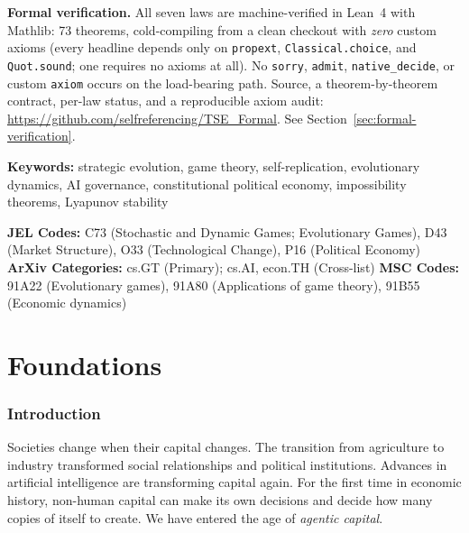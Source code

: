 \documentclass[12pt]{article}
\begin{document}
\noindent\textbf{Formal verification.} All seven laws are machine-verified in Lean~4 with Mathlib: 73 theorems, cold-compiling from a clean checkout with \emph{zero} custom axioms (every headline depends only on \texttt{propext}, \texttt{Classical.choice}, and \texttt{Quot.sound}; one requires no axioms at all). No \texttt{sorry}, \texttt{admit}, \texttt{native\_decide}, or custom \texttt{axiom} occurs on the load-bearing path. Source, a theorem-by-theorem contract, per-law status, and a reproducible axiom audit: \url{https://github.com/selfreferencing/TSE_Formal}. See Section~\ref{sec:formal-verification}.

\noindent\textbf{Keywords:} strategic evolution, game theory, self-replication, evolutionary dynamics, AI governance, constitutional political economy, impossibility theorems, Lyapunov stability

\noindent\textbf{JEL Codes:} C73 (Stochastic and Dynamic Games; Evolutionary Games), D43 (Market Structure), O33 (Technological Change), P16 (Political Economy)
\noindent\textbf{ArXiv Categories:} cs.GT (Primary); cs.AI, econ.TH (Cross-list)
\noindent\textbf{MSC Codes:} 91A22 (Evolutionary games), 91A80 (Applications of game theory), 91B55 (Economic dynamics)

\newpage
\tableofcontents
\newpage


\part{Foundations}


\section{Introduction}

Societies change when their capital changes. The transition from agriculture to industry transformed social relationships and political institutions. Advances in artificial intelligence are transforming capital again. For the first time in economic history, non-human capital can make its own decisions and decide how many copies of itself to create. We have entered the age of \emph{agentic capital}.
\end{document}
